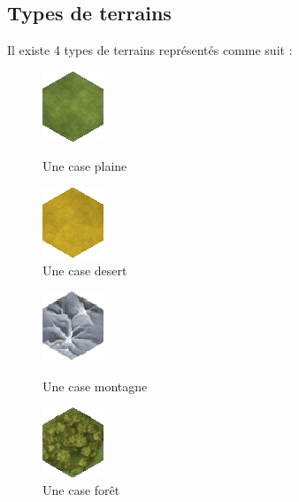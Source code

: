 \subsection{Types de terrains}
Il existe 4 types de terrains représentés comme suit :

\begin{figure}[ht]
\begin{minipage}[b]{0.45\linewidth}
\centering
\includegraphics[scale=1]{img/plaine.png}
\caption{Une case plaine}
\label{fig:figure1}
\end{minipage}
\hspace{0.5cm}
\begin{minipage}[b]{0.45\linewidth}
\centering
\includegraphics[scale=1]{img/desert.png}
\caption{Une case desert}
\label{fig:figure2}
\end{minipage}
\end{figure}

\begin{figure}[ht]
\begin{minipage}[b]{0.45\linewidth}
\centering
\includegraphics[scale=1.35]{img/montagne.png}
\caption{Une case montagne}
\label{fig:figure1}
\end{minipage}
\hspace{0.5cm}
\begin{minipage}[b]{0.45\linewidth}
\centering
\includegraphics[scale=1]{img/foret.png}
\caption{Une case forêt}
\label{fig:figure2}
\end{minipage}
\end{figure}